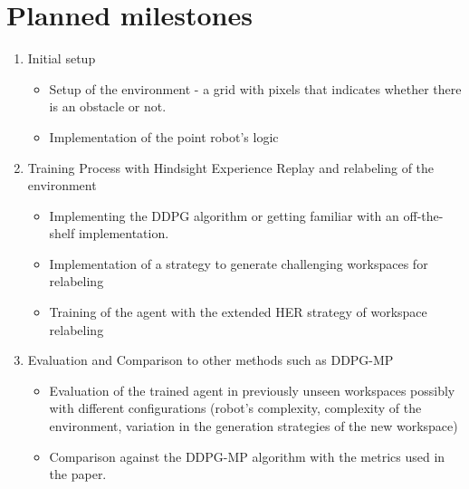 \documentclass[10pt,oneside,a4paper]{report}
\begin{document}
\section*{Planned milestones} 
\begin{enumerate}
    \item Initial setup 
    \begin{itemize}
         \item Setup of the environment - a grid with pixels that indicates whether there is an obstacle or not.
         \item Implementation of the point robot's logic 
    \end{itemize}
    
    \item Training Process with Hindsight Experience Replay and relabeling of the environment
    \begin{itemize}
         \item Implementing the DDPG algorithm or getting familiar with an off-the-shelf implementation.
         \item Implementation of a strategy to generate challenging workspaces for relabeling
         \item Training of the agent with the extended HER strategy of workspace relabeling
    \end{itemize}
    
    \item Evaluation and Comparison to other methods such as DDPG-MP \cite{NMP}
    \begin{itemize}
         \item Evaluation of the trained agent in previously unseen workspaces possibly with different configurations (robot's complexity, complexity of the environment, variation in the generation strategies of the new workspace)
         \item Comparison against the DDPG-MP \cite{NMP} algorithm with the metrics used in the paper.
         
    \end{itemize}
\end{enumerate}

\printbibliography[heading=secbib]
\end{document}

